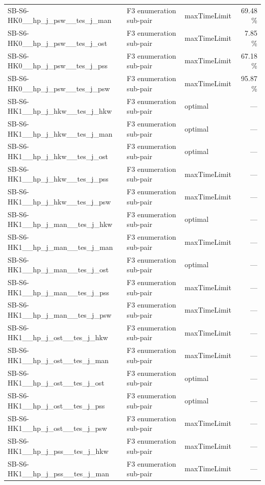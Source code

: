 \begin{table}[htbp]
\begin{tabular}{lllr}
  SB-S6-HK0\_\_hp\_j\_psw\_\_tes\_j\_man & F3 enumeration sub-pair & maxTimeLimit & 69.48 \% \\
  SB-S6-HK0\_\_hp\_j\_psw\_\_tes\_j\_ost & F3 enumeration sub-pair & maxTimeLimit & 7.85 \% \\
  SB-S6-HK0\_\_hp\_j\_psw\_\_tes\_j\_pss & F3 enumeration sub-pair & maxTimeLimit & 67.18 \% \\
  SB-S6-HK0\_\_hp\_j\_psw\_\_tes\_j\_psw & F3 enumeration sub-pair & maxTimeLimit & 95.87 \% \\
  SB-S6-HK1\_\_hp\_j\_hkw\_\_tes\_j\_hkw & F3 enumeration sub-pair & optimal & — \\
  SB-S6-HK1\_\_hp\_j\_hkw\_\_tes\_j\_man & F3 enumeration sub-pair & optimal & — \\
  SB-S6-HK1\_\_hp\_j\_hkw\_\_tes\_j\_ost & F3 enumeration sub-pair & optimal & — \\
  SB-S6-HK1\_\_hp\_j\_hkw\_\_tes\_j\_pss & F3 enumeration sub-pair & maxTimeLimit & — \\
  SB-S6-HK1\_\_hp\_j\_hkw\_\_tes\_j\_psw & F3 enumeration sub-pair & maxTimeLimit & — \\
  SB-S6-HK1\_\_hp\_j\_man\_\_tes\_j\_hkw & F3 enumeration sub-pair & optimal & — \\
  SB-S6-HK1\_\_hp\_j\_man\_\_tes\_j\_man & F3 enumeration sub-pair & maxTimeLimit & — \\
  SB-S6-HK1\_\_hp\_j\_man\_\_tes\_j\_ost & F3 enumeration sub-pair & optimal & — \\
  SB-S6-HK1\_\_hp\_j\_man\_\_tes\_j\_pss & F3 enumeration sub-pair & maxTimeLimit & — \\
  SB-S6-HK1\_\_hp\_j\_man\_\_tes\_j\_psw & F3 enumeration sub-pair & maxTimeLimit & — \\
  SB-S6-HK1\_\_hp\_j\_ost\_\_tes\_j\_hkw & F3 enumeration sub-pair & maxTimeLimit & — \\
  SB-S6-HK1\_\_hp\_j\_ost\_\_tes\_j\_man & F3 enumeration sub-pair & maxTimeLimit & — \\
  SB-S6-HK1\_\_hp\_j\_ost\_\_tes\_j\_ost & F3 enumeration sub-pair & optimal & — \\
  SB-S6-HK1\_\_hp\_j\_ost\_\_tes\_j\_pss & F3 enumeration sub-pair & optimal & — \\
  SB-S6-HK1\_\_hp\_j\_ost\_\_tes\_j\_psw & F3 enumeration sub-pair & maxTimeLimit & — \\
  SB-S6-HK1\_\_hp\_j\_pss\_\_tes\_j\_hkw & F3 enumeration sub-pair & maxTimeLimit & — \\
  SB-S6-HK1\_\_hp\_j\_pss\_\_tes\_j\_man & F3 enumeration sub-pair & maxTimeLimit & — \\

\end{tabular}
\end{table}

